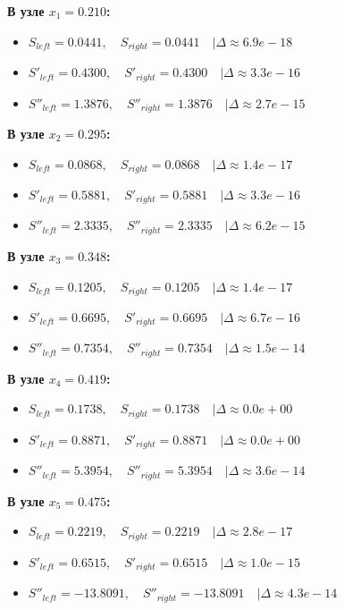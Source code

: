 \textbf{В узле $x_1 = 0.210$:}
\begin{itemize}
    \item $S_{left} = 0.0441, \quad S_{right} = 0.0441 \quad | \Delta \approx 6.9e-18$
    \item $S'_{left} = 0.4300, \quad S'_{right} = 0.4300 \quad | \Delta \approx 3.3e-16$
    \item $S''_{left} = 1.3876, \quad S''_{right} = 1.3876 \quad | \Delta \approx 2.7e-15$
\end{itemize}
\textbf{В узле $x_2 = 0.295$:}
\begin{itemize}
    \item $S_{left} = 0.0868, \quad S_{right} = 0.0868 \quad | \Delta \approx 1.4e-17$
    \item $S'_{left} = 0.5881, \quad S'_{right} = 0.5881 \quad | \Delta \approx 3.3e-16$
    \item $S''_{left} = 2.3335, \quad S''_{right} = 2.3335 \quad | \Delta \approx 6.2e-15$
\end{itemize}
\textbf{В узле $x_3 = 0.348$:}
\begin{itemize}
    \item $S_{left} = 0.1205, \quad S_{right} = 0.1205 \quad | \Delta \approx 1.4e-17$
    \item $S'_{left} = 0.6695, \quad S'_{right} = 0.6695 \quad | \Delta \approx 6.7e-16$
    \item $S''_{left} = 0.7354, \quad S''_{right} = 0.7354 \quad | \Delta \approx 1.5e-14$
\end{itemize}
\textbf{В узле $x_4 = 0.419$:}
\begin{itemize}
    \item $S_{left} = 0.1738, \quad S_{right} = 0.1738 \quad | \Delta \approx 0.0e+00$
    \item $S'_{left} = 0.8871, \quad S'_{right} = 0.8871 \quad | \Delta \approx 0.0e+00$
    \item $S''_{left} = 5.3954, \quad S''_{right} = 5.3954 \quad | \Delta \approx 3.6e-14$
\end{itemize}
\textbf{В узле $x_5 = 0.475$:}
\begin{itemize}
    \item $S_{left} = 0.2219, \quad S_{right} = 0.2219 \quad | \Delta \approx 2.8e-17$
    \item $S'_{left} = 0.6515, \quad S'_{right} = 0.6515 \quad | \Delta \approx 1.0e-15$
    \item $S''_{left} = -13.8091, \quad S''_{right} = -13.8091 \quad | \Delta \approx 4.3e-14$
\end{itemize}
